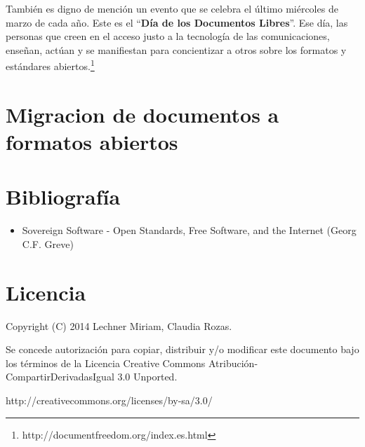 \documentclass[12pt]{article}
\begin{document}
También es digno de mención un evento que se celebra el último miércoles de marzo de cada año. Este es el ``\textbf{Día de los Documentos Libres}''. Ese día, las personas que creen en el acceso justo a la tecnología de las comunicaciones, enseñan, actúan y se manifiestan para concientizar a otros sobre los formatos y estándares abiertos.\footnote{http://documentfreedom.org/index.es.html}


\section*{Migracion de documentos a formatos abiertos}






\section*{Bibliografía}
\begin{itemize}
\item Sovereign Software - Open Standards, Free Software, and the Internet (Georg C.F. Greve)
\end{itemize}

\section*{Licencia}
Copyright (C) 2014 Lechner Miriam, Claudia Rozas.

Se concede autorización para copiar, distribuir y/o modificar este documento
bajo los términos de la Licencia Creative Commons Atribución-CompartirDerivadasIgual 3.0 Unported. 

http://creativecommons.org/licenses/by-sa/3.0/
\end{document}
